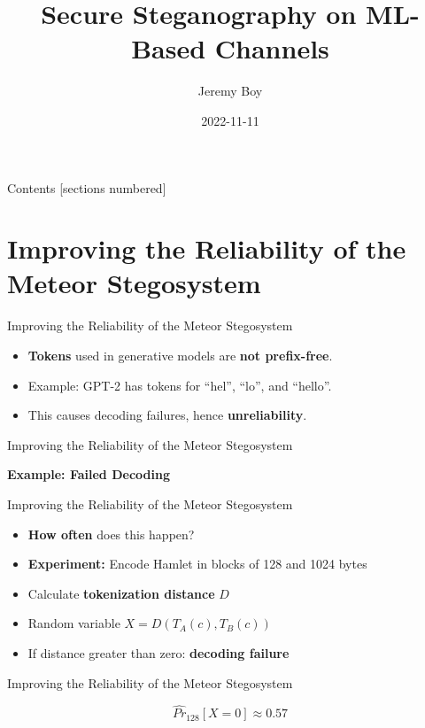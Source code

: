 \documentclass[10pt]{beamer}
\title{Secure Steganography on ML-Based Channels}
\date{2022-11-11}
\author{Jeremy Boy}
\institute{Universität zu Lübeck}
\begin{document}
\maketitle

\begin{frame}{Contents}
  [sections numbered]
  \tableofcontents[hideallsubsections]
\end{frame}

\section{Improving the Reliability of the Meteor Stegosystem}

\begin{frame}{Improving the Reliability of the Meteor Stegosystem}
	\begin{itemize}[<+- | alert@+>]
		\item \textbf{Tokens} used in generative models are \textbf{not prefix-free}.
		\item Example: GPT-2 has tokens for ``hel'', ``lo'', and ``hello''.
		\item This causes decoding failures, hence \textbf{unreliability}.
	\end{itemize}
\end{frame}

\begin{frame}{Improving the Reliability of the Meteor Stegosystem}
	\begin{center}
		\textbf{Example: Failed Decoding}
	\end{center}
\end{frame}

\begin{frame}{Improving the Reliability of the Meteor Stegosystem}
	\begin{itemize}[<+- | alert@+>]
		\item \textbf{How often} does this happen?
		\item \textbf{Experiment:} Encode Hamlet in blocks of 128 and 1024 bytes
		\item Calculate \textbf{tokenization distance} $D$
		\item Random variable $X = D(T_A(c), T_B(c))$
		\item If distance greater than zero: \textbf{decoding failure}
	\end{itemize}
\end{frame}

\begin{frame}{Improving the Reliability of the Meteor Stegosystem}
	\centering
	
	$$\hat{Pr}_{128}[X=0] \approx 0.57$$
\end{frame}
\end{document}
